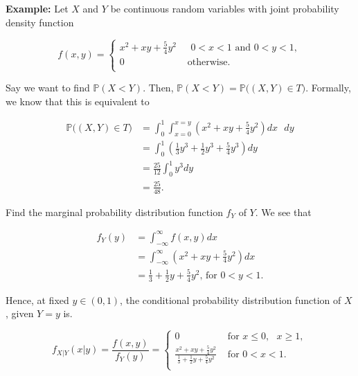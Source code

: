 \documentclass[12pt]{article}
\newcommand{\prob}[1]{\mathbb{P}(#1)}
\begin{document}
\begin{tcolorbox}
\noindent
\textbf{Example:} Let $X$ and $Y$ be continuous random variables with joint probability density function

\[ f(x,y) = \begin{cases} 
	  x^2 + xy + \frac{5}{4} y^2 & \text{ } 0 < x < 1 \text{ and } 0 < y < 1, \\
      0 & \text{ otherwise}. \\
      \end{cases} \]
 
\noindent
Say we want to find $\prob{X < Y}$. Then, $\prob{X < Y} = \mathbb{P} \Big ( (X, Y) \in T \Big )$. Formally, we know that this is equivalent to

\begin{align*}
\mathbb{P} \Big ( (X, Y) \in T \Big ) &= \int_{0}^{1} \int_{x=0}^{x=y} (x^2 + xy + \frac{5}{4} y^2) dx \text{ } dy \\
& = \int_{0}^{1} (\frac{1}{3} y^3 + \frac{1}{2} y^3 + \frac{5}{4} y^3) dy \\
&= \frac{25}{12} \int_{0}^{1} y^3 dy \\
&= \frac{25}{48}.
\end{align*}

\noindent
Find the marginal probability distribution function $f_Y$ of $Y$. We see that 

\begin{align*}
f_Y (y) &= \int_{- \infty}^{\infty} f(x,y) dx \\
&= \int_{- \infty}^{\infty} (x^2 + xy + \frac{5}{4} y^2) dx \\ 
&= \frac{1}{3} + \frac{1}{2} y + \frac{5}{4} y^2 \text{, for } 0 < y < 1.
\end{align*}

\noindent
Hence, at fixed $y \in (0,1)$, the conditional probability distribution function of $X$, given $Y=y$ is. 

\[ f_{X \lvert Y} (x \lvert y) = \frac{f(x,y)}{f_Y(y)} = \begin{cases} 
	  0 & \text{ for } x \leq 0, \text{ } x \geq 1, \\
      \frac{x^2 + xy + \frac{5}{4} y^2}{\frac{1}{3} + \frac{1}{2} y + \frac{5}{4} y^2} & \text{ for } 0 < x < 1. \\
      \end{cases} \]
\end{tcolorbox}
\end{document}
